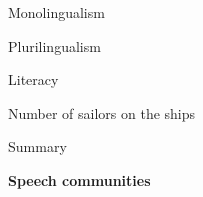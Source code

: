 \begin{listWWNumvileveli}
\begin{listWWNumvilevelii}
\setcounter{listWWNumvileveliii}{0}
\begin{listWWNumvileveliii}
\item 
\begin{styleListParagraph}
Monolingualism
\end{styleListParagraph}
\item 
\begin{styleListParagraph}
Plurilingualism 
\end{styleListParagraph}
\end{listWWNumvileveliii}
\item 
\begin{styleListParagraph}
Literacy 
\end{styleListParagraph}
\item 
\begin{styleListParagraph}
Number of sailors on the ships 
\end{styleListParagraph}
\item 
\begin{styleListParagraph}
Summary
\end{styleListParagraph}
\end{listWWNumvilevelii}
\end{listWWNumvileveli}

\setcounter{listWWNumiileveli}{0}
\begin{listWWNumiileveli}
\item 
\begin{styleListParagraph}
\textbf{Speech communities }
\end{styleListParagraph}
\end{listWWNumiileveli}

